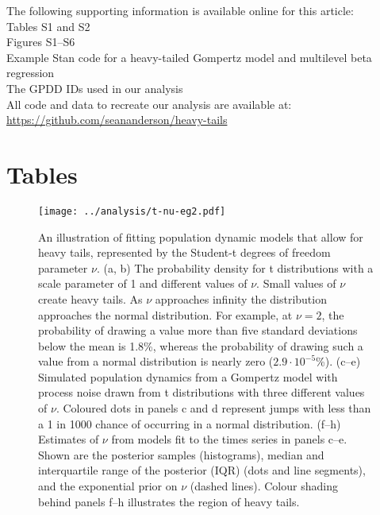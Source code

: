 The following supporting information is available online for this article:\\
Tables S1 and S2\\
Figures S1--S6\\
Example Stan code for a heavy-tailed Gompertz model and multilevel beta
regression\\
The GPDD IDs used in our analysis\\
All code and data to recreate our analysis are available at:\\
\url{https://github.com/seananderson/heavy-tails}



%

\clearpage

\section{Tables}



\clearpage

\begin{figure}[htbp]
\begin{center}
\texttt{[image: ../analysis/t-nu-eg2.pdf]}
\caption{
An illustration of fitting population dynamic models that allow for heavy
tails, represented by the Student-t degrees of freedom parameter $\nu$. (a, b)
The probability density for t distributions with a scale parameter of 1 and
different values of $\nu$. Small values of $\nu$ create heavy tails. As $\nu$
approaches infinity the distribution approaches the normal distribution. For
example, at $\nu = 2$, the probability of drawing a value more than five
standard deviations below the mean is 1.8\%, whereas the probability of drawing
such a value from a normal distribution is nearly zero ($2.9\cdot10^{-5}$\%).
(c--e) Simulated population dynamics from a Gompertz model with process noise
drawn from t distributions with three different values of $\nu$. Coloured dots
in panels c and d represent jumps with less than a 1 in 1000 chance of
occurring in a normal distribution. (f--h) Estimates of $\nu$ from models fit
to the times series in panels c--e. Shown are the posterior samples
(histograms), median and interquartile range of the posterior (IQR) (dots and
line segments), and the exponential prior on $\nu$ (dashed lines). Colour
shading behind panels f--h illustrates the region of heavy tails.
}
\label{fig:didactic}
\end{center}
\end{figure}

